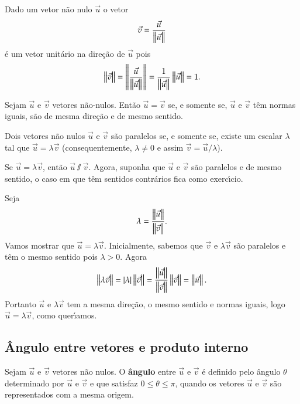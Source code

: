 \begin{observacao}
	Dado um vetor n\~ao nulo $\vec{u}$ o vetor
	\[
  		\vec{v} = \dfrac{\vec{u}}{\left\Vert{\vec{u}}\right\Vert}
	\]
	\'e um vetor unit\'ario na dire\c{c}\~ao de $\vec{u}$ pois
	\[
  		\left\Vert{\vec{v}}\right\Vert = \left\Vert{\dfrac{\vec{u}}{\left\Vert{\vec{u}}\right\Vert}}\right\Vert = \dfrac{1}{\left\Vert{\vec{u}}\right\Vert}\left\Vert{\vec{u}}\right\Vert = 1.
	\]

\end{observacao}
\begin{definicao}
	Sejam $\vec{u}$ e $\vec{v}$ vetores n\~ao-nulos. Ent\~ao $\vec{u} = \vec{v}$ se, e somente se, $\vec{u}$ e $\vec{v}$ t\^em normas iguais, s\~ao de mesma dire\c{c}\~ao e de mesmo sentido.
\end{definicao}

\begin{proposicao}\label{vetores_paralelos}
  Dois vetores n\~ao nulos $\vec{u}$ e $\vec{v}$ s\~ao paralelos se, e somente se, existe um escalar $\lambda$ tal que $\vec{u} = \lambda\vec{v}$ (consequentemente, $\lambda \ne 0$ e assim $\vec{v} = \vec{u}/\lambda$).
\end{proposicao}
\begin{prova}
	Se $\vec{u} = \lambda\vec{v}$, ent\~ao $\vec{u}\varparallel\vec{v}$.
	Agora, suponha que $\vec{u}$ e $\vec{v}$ s\~ao paralelos e de mesmo sentido, o caso em que t\^em sentidos contr\'arios fica como exerc{\'\i}cio.

	Seja 
	\[
		\lambda = \dfrac{\left\Vert{\vec{u}}\right\Vert}{\left\Vert{\vec{v}}\right\Vert}.
	\]
	Vamos mostrar que $\vec{u} = \lambda\vec{v}$. Inicialmente, sabemos que $\vec{v}$ e $\lambda\vec{v}$ s\~ao paralelos e t\^em o mesmo sentido pois $\lambda > 0$. Agora
	\[
		\left\Vert{\lambda\vec{v}}\right\Vert = |\lambda|\left\Vert{\vec{v}}\right\Vert = \dfrac{\left\Vert{\vec{u}}\right\Vert}{\left\Vert{\vec{v}}\right\Vert}\left\Vert{\vec{v}}\right\Vert = \left\Vert{\vec{u}}\right\Vert.
	\]
	Portanto $\vec{u}$ e $\lambda\vec{v}$ tem a mesma dire\c{c}\~ao, o mesmo sentido e normas iguais, logo $\vec{u} = \lambda\vec{v}$, como quer{\'\i}amos.
\end{prova}

\subsection{\^Angulo entre vetores e produto interno} %
\label{sub:angulo_entre_vetores_e_produto_interno}
\begin{definicao}
  Sejam $\vec{u}$ e $\vec{v}$ vetores n\~ao nulos. O \textbf{\^angulo} entre $\vec{u}$ e $\vec{v}$ \'e definido pelo \^angulo $\theta$ determinado por $\vec{u}$ e $\vec{v}$ e que satisfaz $0 \le \theta \le \pi$, quando os vetores $\vec{u}$ e $\vec{v}$ s\~ao representados com a mesma origem.
\end{definicao}

